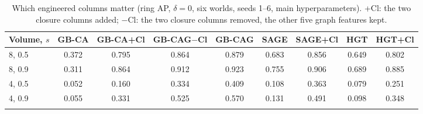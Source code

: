 \begin{table}[h]
\caption{Which engineered columns matter (ring AP, $\delta=0$, six worlds, seeds 1--6, main hyperparameters). +Cl: the two closure columns added; $-$Cl: the two closure columns removed, the other five graph features kept.}\label{tab:closure}
\scriptsize
\setlength{\tabcolsep}{2pt}
\begin{tabular}{@{}lcccccccc@{}}
\toprule
Volume, $s$ & GB-CA & GB-CA+Cl & GB-CAG$-$Cl & GB-CAG & SAGE & SAGE+Cl & HGT & HGT+Cl \\
\midrule
8, 0.5 & 0.372 & 0.795 & 0.864 & 0.879 & 0.683 & 0.856 & 0.649 & 0.802 \\
8, 0.9 & 0.311 & 0.864 & 0.912 & 0.923 & 0.755 & 0.906 & 0.689 & 0.885 \\
4, 0.5 & 0.052 & 0.160 & 0.334 & 0.409 & 0.108 & 0.363 & 0.079 & 0.251 \\
4, 0.9 & 0.055 & 0.331 & 0.525 & 0.570 & 0.131 & 0.491 & 0.098 & 0.348 \\
\botrule
\end{tabular}
\end{table}